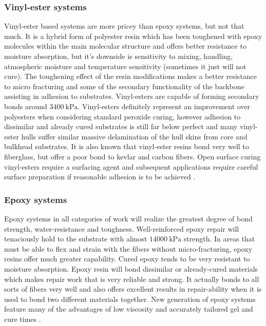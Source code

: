 \subsubsection{Vinyl-ester systems}\label{subsec:vinyl_ester}
Vinyl-ester based systems are more pricey than epoxy systems, but not that much. It is a hybrid form of polyester resin which has been toughened with epoxy molecules within the main molecular structure and offers better resistance to moisture absorption, but it's downside is sensitivity to mixing, handling, atmospheric moisture and temperature sensitivity (sometimes it just will not cure). The toughening effect of the resin modifications makes a better resistance to micro fracturing and some of the secondary functionality of the backbone assisting in adhesion to substrates. Vinyl-esters are capable of forming secondary bonds around $3400~\mathrm{kPa}$. Vinyl-esters definitely represent an improvement over polyesters when considering standard peroxide curing, however adhesion to dissimilar and already cured substrates is still far below perfect and many vinyl-ester hulls suffer similar massive delamination of the hull skins from core and bulkhead substrates. It is also known that vinyl-ester resins bond very well to fiberglass, but offer a poor bond to kevlar and carbon fibers.  Open surface curing vinyl-esters require a surfacing agent and subsequent applications require careful surface preparation if reasonable adhesion is to be achieved \cite{thermosetting_polymers}.

\subsubsection{Epoxy systems}\label{subsec:epoxy_systems}
Epoxy systems in all categories of work will realize the greatest degree of bond strength, water-resistance and toughness. Well-reinforced epoxy repair will tenaciously hold to the substrate with almost $14 000~\mathrm{kPa}$ strength. In areas that must be able to flex and strain with the fibers without micro-fracturing, epoxy resins offer much greater capability. Cured epoxy tends to be very resistant to moisture absorption. Epoxy resin will bond dissimilar or already-cured materials which makes repair work that is  very reliable and strong. It actually bonds to all sorts of fibers very well and also offers excellent results in repair-ability when it is used to bond two different materials together. New generation of epoxy systems feature many of the advantages of low viscosity and accurately tailored gel and cure times \cite{thermosetting_polymers}. 

